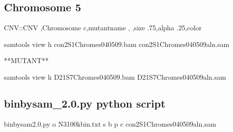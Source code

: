 \documentclass[letterpaper,10pt,english]{sphinxhowto}
\begin{document}
\subsection{Chromosome 5}
\label{\detokenize{CNV:chromosome-5}}
\begin{sphinxVerbatim}[commandchars=\\\{\}]
CNV::CNV  ,Chromosome   c,mutantname  ,
  ,size  .75,alpha  .25,color
\end{sphinxVerbatim}

\begin{figure}[htbp]
\centering

\noindent{}
\end{figure}



\begin{sphinxVerbatim}[commandchars=\\\{\}]
samtools view \PYGZhy{}h con\PYGZhy{}2\PYGZus{}S1\PYGZhy{}Chromes\PYGZhy{}04\PYGZhy{}05\PYGZhy{}09.bam \PYGZgt{} con\PYGZhy{}2\PYGZus{}S1\PYGZhy{}Chromes\PYGZhy{}04\PYGZhy{}05\PYGZhy{}09\PYGZus{}aln.sam

**MUTANT**
\end{sphinxVerbatim}

\begin{sphinxVerbatim}[commandchars=\\\{\}]
samtools view \PYGZhy{}h D2\PYGZhy{}1\PYGZus{}S7\PYGZhy{}Chromes\PYGZhy{}04\PYGZhy{}05\PYGZhy{}09.bam \PYGZgt{} D2\PYGZhy{}1\PYGZus{}S7\PYGZhy{}Chromes\PYGZhy{}04\PYGZhy{}05\PYGZhy{}09\PYGZus{}aln.sam
\end{sphinxVerbatim}


\subsection{bin\sphinxhyphen{}by\sphinxhyphen{}sam\_2.0.py python script}
\label{\detokenize{CNV:bin-by-sam-2-0-py-python-script}}
\begin{sphinxVerbatim}[commandchars=\\\{\}]
 bin\PYGZhy{}by\PYGZhy{}sam\PYGZus{}2.0.py \PYGZhy{}o N3\PYGZus{}100kbin.txt \PYGZhy{}s  \PYGZhy{}b \PYGZhy{}p  \PYGZhy{}c con\PYGZhy{}2\PYGZus{}S1\PYGZhy{}Chromes\PYGZhy{}04\PYGZhy{}05\PYGZhy{}09\PYGZus{}aln.sam
\end{sphinxVerbatim}
\end{document}
